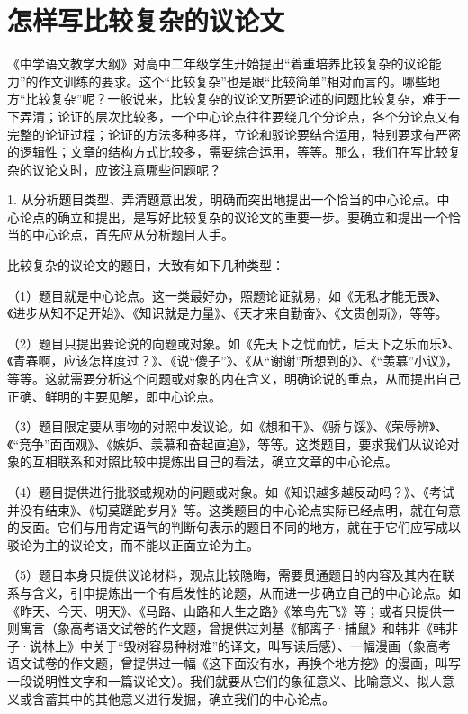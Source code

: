 
\section{怎样写比较复杂的议论文}

《中学语文教学大纲》对高中二年级学生开始提出“着重培养比较复杂的议论能力”的作文训练的要求。这个“比较复杂”也是跟“比较简单”相对而言的。哪些地方“比较复杂”呢？一般说来，比较复杂的议论文所要论述的问题比较复杂，难于一下弄清；论证的层次比较多，一个中心论点往往要绕几个分论点，各个分论点又有完整的论证过程；论证的方法多种多样，立论和驳论要结合运用，特别要求有严密的逻辑性；文章的结构方式比较多，需要综合运用，等等。那么，我们在写比较复杂的议论文时，应该注意哪些问题呢？

1. 从分析题目类型、弄清题意出发，明确而突出地提出一个恰当的中心论点。中心论点的确立和提出，是写好比较复杂的议论文的重要一步。要确立和提出一个恰当的中心论点，首先应从分析题目入手。

比较复杂的议论文的题目，大致有如下几种类型：

（1）题目就是中心论点。这一类最好办，照题论证就易，如《无私才能无畏》、《进步从知不足开始》、《知识就是力量》、《天才来自勤奋》、《文贵创新》，等等。

（2）题目只提出要论说的向题或对象。如《先天下之忧而忧，后天下之乐而乐》、《青春啊，应该怎样度过？》、《说“傻子”》、《从“谢谢”所想到的》、《“羡慕”小议》，等等。这就需要分析这个问题或对象的内在含义，明确论说的重点，从而提出自己正确、鲜明的主要见解，即中心论点。

（3）题目限定要从事物的对照中发议论。如《想和干》、《骄与馁》、《荣辱辨》、《“竞争”面面观》、《嫉妒、羡慕和奋起直追》，等等。这类题目，要求我们从议论对象的互相联系和对照比较中提炼出自己的看法，确立文章的中心论点。

（4）题目提供进行批驳或规劝的问题或对象。如《知识越多越反动吗？》、《考试并没有结束》、《切莫蹉跎岁月》等。这类题目的中心论点实际已经点明，就在句意的反面。它们与用肯定语气的判断句表示的题目不同的地方，就在于它们应写成以驳论为主的议论文，而不能以正面立论为主。

（5）题目本身只提供议论材料，观点比较隐晦，需要贯通题目的内容及其内在联系与含义，引申提炼出一个有启发性的论题，从而进一步确立自己的中心论点。如《昨天、今天、明天》、《马路、山路和人生之路》《笨鸟先飞》等；或者只提供一则寓言（象高考语文试卷的作文题，曾提供过刘基《郁离子·捕鼠》和韩非《韩非子·说林上》中关于“毁树容易种树难”的译文，叫写读后感）、一幅漫画（象高考语文试卷的作文题，曾提供过一幅《这下面没有水，再换个地方挖》的漫画，叫写一段说明性文字和一篇议论文）。我们就要从它们的象征意义、比喻意义、拟人意义或含蓄其中的其他意义进行发掘，确立我们的中心论点。

